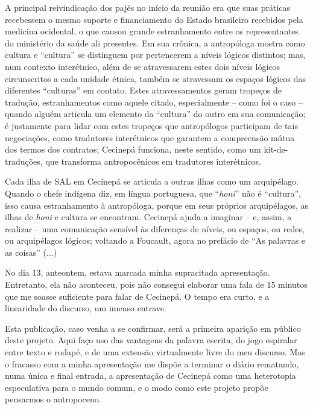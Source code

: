 A principal reivindicação dos pajés no início da reunião era que suas práticas recebessem o mesmo suporte e financiamento do Estado brasileiro recebidos pela medicina ocidental, o que causou grande estranhamento entre os representantes do ministério da saúde ali presentes. Em sua crônica, a antropóloga mostra como cultura e \enquote{cultura} se distinguem por pertencerem a níveis lógicos distintos; mas, num contexto interétnico, além de se atravessarem estes dois níveis lógicos circunscritos a cada unidade étnica, também se atravessam os espaços lógicos das diferentes \enquote{culturas} em contato. Estes atravessamentos geram tropeços de tradução, estranhamentos como aquele citado, especialmente -- como foi o caso -- quando alguém articula um elemento da \enquote{cultura} do outro em sua comunicação; é justamente para lidar com estes tropeços que antropólogos participam de tais negociações, como tradutores interétnicos que garantem a compreensão mútua dos termos dos contratos; Cecinepá funciona, neste sentido, como um kit-de-traduções, que transforma antropocênicos em tradutores interétnicos.

Cada ilha de SAL em Cecinepá se articula a outras ilhas como um arquipélago. Quando o chefe indígena diz, em língua portuguesa, que \enquote{\textit{honi}} não é \enquote{cultura}, isso causa estranhamento à antropóloga, porque em seus próprios arquipélagos, as ilhas de \textit{honi} e cultura se encontram. Cecinepá ajuda a imaginar -- e, assim, a realizar -- uma comunicação sensível às diferenças de níveis, ou espaços, ou redes, ou arquipélagos lógicos; voltando a Foucault, agora no prefácio de \enquote{As palavras e as coisas} (...)


No dia 13, anteontem, estava marcada minha supracitada apresentação. Entretanto, ela não aconteceu, pois não consegui elaborar uma fala de 15 minutos que me soasse suficiente para falar de Cecinepá. O tempo era curto, e a linearidade do discurso, um imenso entrave.

Esta publicação, caso venha a se confirmar, será a primeira aparição em público deste projeto. Aqui faço uso das vantagens da palavra escrita, do jogo espiralar entre texto e rodapé, e de uma extensão virtualmente livre do meu discurso. Mas o fracasso com a minha apresentação me dispõe a terminar o diário rematando, numa única e final entrada, a apresentação de Cecinepá como uma heterotopia especulativa para o mundo comum, e o modo como este projeto propõe pensarmos o antropoceno.

